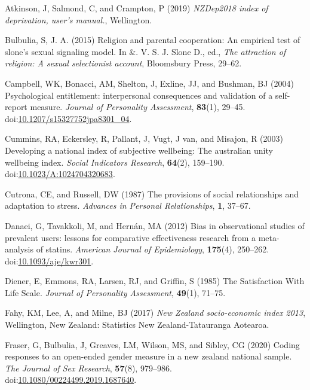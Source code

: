 \documentclass[
  singlecolumn,
  9pt]{article}
\newlength{\cslhangindent}
\newenvironment{CSLReferences}[2] %
 {\begin{list}{}{%
  \setlength{\itemindent}{0pt}
  \setlength{\leftmargin}{0pt}
  \setlength{\parsep}{0pt}
  \ifodd #1
   \setlength{\leftmargin}{\cslhangindent}
   \setlength{\itemindent}{-1\cslhangindent}
  \fi
  \setlength{\itemsep}{#2\baselineskip}}}
 {\end{list}}
\begin{document}
\label{refs}
\begin{CSLReferences}{1}{0}
Atkinson, J, Salmond, C, and Crampton, P (2019) \emph{NZDep2018 index of
deprivation, user{'}s manual.}, Wellington.

Bulbulia, S, J. A. (2015) Religion and parental cooperation: An
empirical test of slone's sexual signaling model. In \&. V. S. J. Slone
D., ed., \emph{The attraction of religion: A sexual selectionist
account}, Bloomsbury Press, 29--62.

Campbell, WK, Bonacci, AM, Shelton, J, Exline, JJ, and Bushman, BJ
(2004) Psychological entitlement: interpersonal consequences and
validation of a self-report measure. \emph{Journal of Personality
Assessment}, \textbf{83}(1), 29--45.
doi:\href{https://doi.org/10.1207/s15327752jpa8301_04}{10.1207/s15327752jpa8301\_04}.

Cummins, RA, Eckersley, R, Pallant, J, Vugt, J van, and Misajon, R
(2003) Developing a national index of subjective wellbeing: The
australian unity wellbeing index. \emph{Social Indicators Research},
\textbf{64}(2), 159--190.
doi:\href{https://doi.org/10.1023/A:1024704320683}{10.1023/A:1024704320683}.

Cutrona, CE, and Russell, DW (1987) The provisions of social
relationships and adaptation to stress. \emph{Advances in Personal
Relationships}, \textbf{1}, 37--67.

Danaei, G, Tavakkoli, M, and Hernán, MA (2012) Bias in observational
studies of prevalent users: lessons for comparative effectiveness
research from a meta-analysis of statins. \emph{American Journal of
Epidemiology}, \textbf{175}(4), 250--262.
doi:\href{https://doi.org/10.1093/aje/kwr301}{10.1093/aje/kwr301}.

Diener, E, Emmons, RA, Larsen, RJ, and Griffin, S (1985) The
Satisfaction With Life Scale. \emph{Journal of Personality Assessment},
\textbf{49}(1), 71--75.

Fahy, KM, Lee, A, and Milne, BJ (2017) \emph{New Zealand socio-economic
index 2013}, Wellington, New Zealand: Statistics New Zealand-Tatauranga
Aotearoa.

Fraser, G, Bulbulia, J, Greaves, LM, Wilson, MS, and Sibley, CG (2020)
Coding responses to an open-ended gender measure in a new zealand
national sample. \emph{The Journal of Sex Research}, \textbf{57}(8),
979--986.
doi:\href{https://doi.org/10.1080/00224499.2019.1687640}{10.1080/00224499.2019.1687640}.


\end{CSLReferences}
\end{document}
